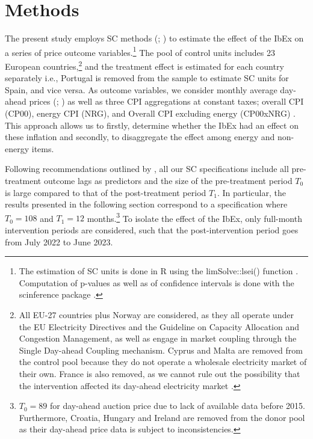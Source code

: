 \documentclass[12pt,a4paper]{article}
\begin{document}
\section{Methods}\label{methods}
The present study employs SC methods (\cite{abadie2003}; \cite{abadie2010}) to estimate the effect of the IbEx on a series of price outcome variables.\footnote{The estimation of SC units is done in R using the limSolve::lsei() function \parencite{soetaert2009}. Computation of p-values as well as of confidence intervals is done with the scinference package \parencite{wuthrich2021}.} The pool of control units includes 23 European countries,\footnote{All EU-27 countries plus Norway are considered, as they all operate under the EU Electricity Directives and the Guideline on Capacity Allocation and Congestion Management, as well as engage in market coupling through the Single Day-ahead Coupling mechanism. Cyprus and Malta are removed from the control pool because they do not operate a wholesale electricity market of their own. France is also removed, as we cannot rule out the possibility that the intervention affected its day-ahead electricity market \parencite{schlecht2022}.} and the treatment effect is estimated for each country separately i.e., Portugal is removed from the sample to estimate SC units for Spain, and vice versa. As outcome variables, we consider monthly average day-ahead prices (\cite{omie2022}; \cite{energycharts2022}) as well as three CPI aggregations at constant taxes; overall CPI (CP00), energy CPI (NRG), and Overall CPI excluding energy (CP00xNRG) \parencite{eurostat2023b}. This approach allows us to firstly, determine whether the IbEx had an effect on these inflation and secondly, to disaggregate the effect among energy and non-energy items.\par 
Following recommendations outlined by \textcite{ferman2020}, all our SC specifications include all pre-treatment outcome lags as predictors and the size of the pre-treatment period $T_0$ is large compared to that of the post-treatment period $T_1$. In particular, the results presented in the following section correspond to a specification where $T_0=108$ and $T_1=12$ months.\footnote{$T_0=89$ for day-ahead auction price due to lack of available data before 2015. Furthermore, Croatia, Hungary and Ireland are removed from the donor pool as their day-ahead price data is subject to inconsistencies.} To isolate the effect of the IbEx, only full-month intervention periods are considered, such that the post-intervention period goes from July 2022 to June 2023.\par
\end{document}

